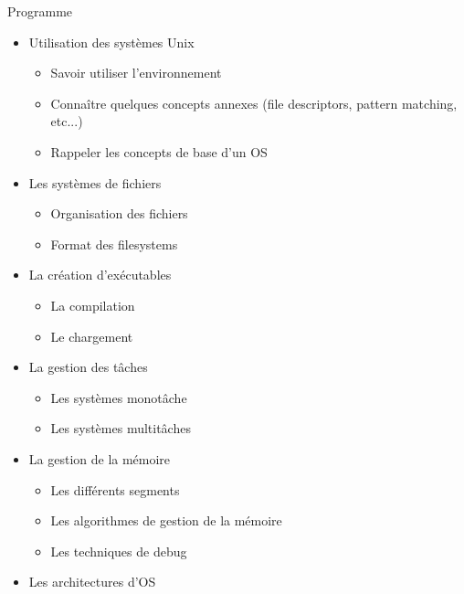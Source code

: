 %
%
%


\begin{frame}[fragile=singleslide]{Programme}
  \begin{itemize}
  \item Utilisation des systèmes Unix
    \begin{itemize}
    \item Savoir utiliser l'environnement
    \item  Connaître  quelques  concepts  annexes  (file  descriptors,
      pattern matching, etc...)
    \item Rappeler les concepts de base d'un OS
    \end{itemize}
  \item Les systèmes de fichiers
    \begin{itemize}
      \item Organisation des fichiers
      \item Format des filesystems
    \end{itemize}
  \item La création d'exécutables
    \begin{itemize}
    \item La compilation
    \item Le chargement
    \end{itemize}
  \item La gestion des tâches
    \begin{itemize}
    \item Les systèmes monotâche
    \item Les systèmes multitâches
    \end{itemize}
  \item La gestion de la mémoire
    \begin{itemize}
    \item Les différents segments
    \item Les algorithmes de gestion de la mémoire
    \item Les techniques de debug
    \end{itemize}
  \item Les architectures d'OS
  \end{itemize}
\end{frame}
